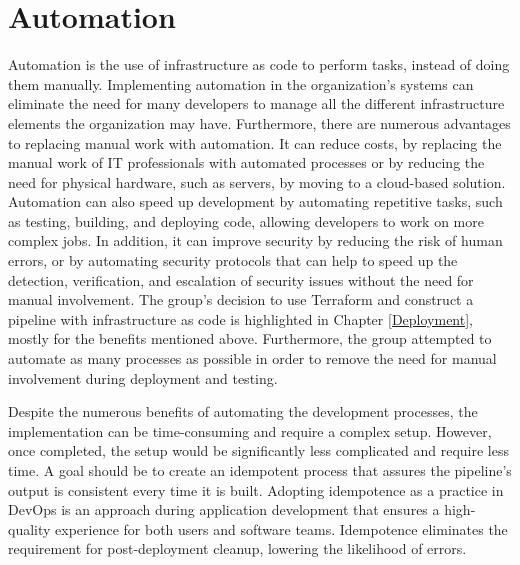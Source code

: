 




\section{Automation}
Automation is the use of \gls{infrastructure as code} to perform tasks, instead of doing them manually. Implementing automation in the organization's systems can eliminate the need for many developers to manage all the different infrastructure elements the organization may have. Furthermore, there are numerous advantages to replacing manual work with automation. It can reduce costs, by replacing the manual work of IT professionals with automated processes or by reducing the need for physical hardware, such as servers, by moving to a cloud-based solution. Automation can also speed up development by automating repetitive tasks, such as testing, building, and deploying code, allowing developers to work on more complex jobs. In addition, it can improve security by reducing the risk of human errors, or by automating security protocols that can help to speed up the detection, verification, and escalation of security issues without the need for manual involvement. The group's decision to use Terraform and construct a pipeline with \gls{infrastructure as code} is highlighted in Chapter \ref{Deployment}, mostly for the benefits mentioned above. Furthermore, the group attempted to automate as many processes as possible in order to remove the need for manual involvement during deployment and testing. \cite{automation}

Despite the numerous benefits of automating the development processes, the implementation can be time-consuming and require a complex setup. However, once completed, the setup would be significantly less complicated and require less time. A goal should be to create an idempotent process that assures the pipeline's output is consistent every time it is built. Adopting idempotence as a practice in DevOps is an approach during application development that ensures a high-quality experience for both users and software teams. Idempotence eliminates the requirement for post-deployment cleanup, lowering the likelihood of errors. \cite{idempotent}

